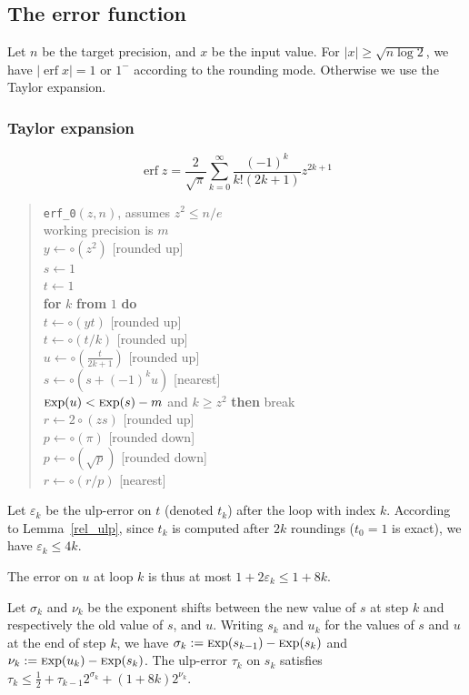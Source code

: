 \documentclass[12pt]{amsart}
\DeclareMathOperator{\erf}{erf}
\def\q{\hspace*{5mm}}
\def\Exp{{\rm \textsc exp}}
\begin{document}
\subsection{The error function}

Let $n$ be the target precision, and $x$ be the input value.
For $|x| \geq \sqrt{n \log 2}$, we have $|\erf x| = 1$
or $1^{-}$ according to the rounding mode.
Otherwise we use the Taylor expansion.

\subsubsection{Taylor expansion}

\[ \erf z = \frac{2}{\sqrt{\pi}} \sum_{k=0}^{\infty} \frac{(-1)^k}
        {k! (2k+1)} z^{2k+1} \]

\begin{quote}
\verb|erf_0|$(z, n)$, assumes $z^2 \le n/e$ \\
working precision is $m$ \\
$y \leftarrow \circ (z^2)$ [rounded up] \\
$s \leftarrow 1$ \\
$t \leftarrow 1$ \\
{\bf for} $k$ {\bf from} $1$ {\bf do} \\
\q $t \leftarrow \circ (y t)$ [rounded up] \\
\q $t \leftarrow \circ (t/k)$ [rounded up] \\
\q $u \leftarrow \circ (\frac{t}{2k+1})$ [rounded up] \\
\q $s \leftarrow \circ (s + (-1)^k u)$ [nearest] \\
\q {\bf if} $\Exp(u) < \Exp(s) - m$ and $k \geq z^2$
        {\bf then} break \\
$r \leftarrow 2 \circ (z s)$ [rounded up] \\
$p \leftarrow \circ (\pi)$ [rounded down] \\
$p \leftarrow \circ (\sqrt{p})$ [rounded down] \\
$r \leftarrow \circ (r/p)$ [nearest]
\end{quote}

Let $\varepsilon_k$ be the ulp-error on $t$ (denoted $t_k$)
after the loop with index $k$.
According to Lemma~\ref{rel_ulp}, since $t_k$ is computed after $2k$
roundings ($t_0=1$ is exact), we have $\varepsilon_k \leq 4k$.

The error on $u$ at loop $k$ is thus at most
$1+2\varepsilon_k \leq 1+8k$.

Let $\sigma_k$ and $\nu_k$ be the exponent shifts between the new value of
$s$ at step $k$ and respectively the old value of $s$, and $u$.
Writing $s_k$ and $u_k$ for the values of $s$ and $u$ at the end of step $k$,
we have $\sigma_k := \Exp(s_{k-1}) - \Exp(s_k)$
and $\nu_k := \Exp(u_k) - \Exp(s_k)$.
The ulp-error $\tau_k$ on $s_k$ satisfies
$\tau_k \leq \frac{1}{2} + \tau_{k-1} 2^{\sigma_k} + (1+8k) 2^{\nu_k}$.
\end{document}
